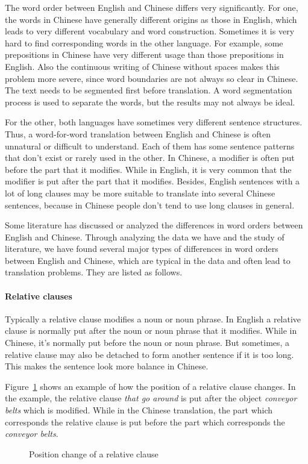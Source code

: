 The word order between English and Chinese differs very significantly. For one, the words in Chinese have generally different origins as those in English, which leads to very different vocabulary and word construction. Sometimes it is very hard to find corresponding words in the other language. For example, some prepositions in Chinese have very different usage than those prepositions in English. Also the continuous writing of Chinese without spaces makes this problem more severe, since word boundaries are not always so clear in Chinese. The text needs to be segmented first before translation. A word segmentation process is used to separate the words, but the results may not always be ideal.

For the other, both languages have sometimes very different sentence structures. Thus, a word-for-word translation between English and Chinese is often unnatural or difficult to understand. Each of them has some sentence patterns that don't exist or rarely used in the other. In Chinese, a modifier is often put before the part that it modifies. While in English, it is very common that the modifier is put after the part that it modifies. Besides, English sentences with a lot of long clauses may be more suitable to translate into several Chinese sentences, because in Chinese people don't tend to use long clauses in general. 

Some literature \citep{syntactic} has discussed or analyzed the differences in word orders between English and Chinese. Through analyzing the data we have and the study of literature, we have found several major types of differences in word orders between English and Chinese, which are typical in the data and often lead to translation problems. They are listed as follows.

\paragraph{Relative clauses}
Typically a relative clause modifies a noun or noun phrase. In English a relative clause is normally put after the noun or noun phrase that it modifies. While in Chinese, it's normally put before the noun or noun phrase. But sometimes, a relative clause may also be detached to form another sentence if it is too long. This makes the sentence look more balance in Chinese. 

Figure~\ref{g1} shows an example of how the position of a relative clause changes. In the example, the relative clause \emph{that go around} is put after the object \emph{conveyor belts} which is modified. While in the Chinese translation, the part  which corresponds the relative clause is put before the part  which corresponds the \emph{conveyor belts}. %
\begin{figure}[H]
\centering

\caption{Position change of a relative clause}
\label{g1}
\end{figure}

